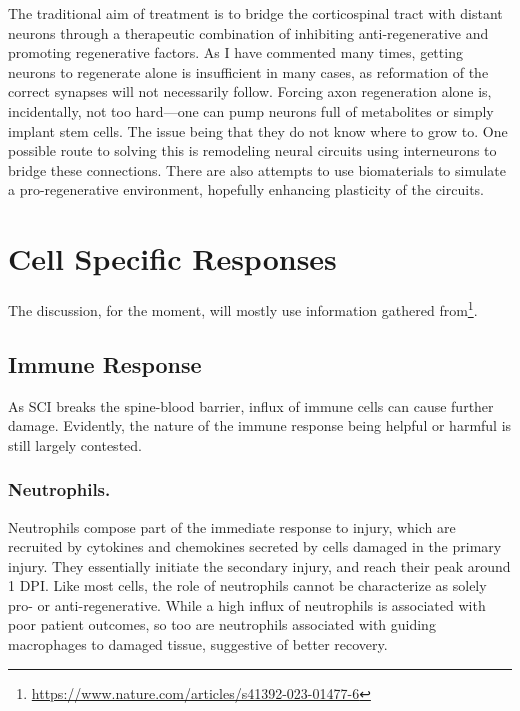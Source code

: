 \documentclass[12pt]{report}
\begin{document}
The traditional aim of treatment is to bridge the corticospinal tract with distant neurons through a therapeutic combination of inhibiting anti-regenerative and promoting regenerative factors. As I have commented many times, getting neurons to regenerate alone is insufficient in many cases, as reformation of the correct synapses will not necessarily follow. Forcing axon regeneration alone is, incidentally, not too hard---one can pump neurons full of metabolites or simply implant stem cells. The issue being that they do not know where to grow to. One possible route to solving this is remodeling neural circuits using interneurons to bridge these connections. There are also attempts to use biomaterials to simulate a pro-regenerative environment, hopefully enhancing plasticity of the circuits.\newline


\section{Cell Specific Responses}

\label{sec:Cell-Specific-Responses}

The discussion, for the moment, will mostly use information gathered from\footnote{\url{https://www.nature.com/articles/s41392-023-01477-6}}.


\subsection{Immune Response}
As SCI breaks the spine-blood barrier, influx of immune cells can cause further damage. Evidently, the nature of the immune response being helpful or harmful is still largely contested.

\subsubsection{Neutrophils.}
Neutrophils compose part of the immediate response to injury, which are recruited by cytokines and chemokines secreted by cells damaged in the primary injury. They essentially initiate the secondary injury, and reach their peak around 1 DPI. Like most cells, the role of neutrophils cannot be characterize as solely pro- or anti-regenerative. While a high influx of neutrophils is associated with poor patient outcomes, so too are neutrophils associated with guiding macrophages to damaged tissue, suggestive of better recovery. 
\end{document}
